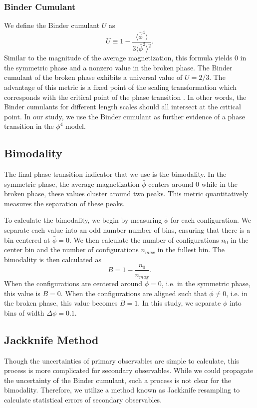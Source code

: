 \subsubsection{Binder Cumulant}
We define the Binder cumulant $U$ as \cite{binder1981}
\begin{equation}
U \equiv 1-\frac{\langle {\bar\phi}^4 \rangle}{3\langle {\bar\phi}^2\rangle^2}.
\end{equation}
Similar to the magnitude of the average magnetization, this formula yields $0$ in the symmetric phase and a nonzero value in the broken phase. The Binder cumulant of the broken phase exhibits a universal value of $U = 2/3$. The advantage of this metric is a fixed point of the scaling transformation which corresponds with the critical point of the phase transition \cite{landau2000}. In other words, the Binder cumulants for different length scales should all intersect at the critical point. In our study, we use the Binder cumulant as further evidence of a phase transition in the $\phi^4$ model.


\subsection{Bimodality}
The final phase transition indicator that we use is the bimodality. In the symmetric phase, the average magnetization $\bar\phi$ centers around $0$ while in the broken phase, these values cluster around two peaks. This metric quantitatively measures the separation of these peaks.

To calculate the bimodality, we begin by measuring $\bar\phi$ for each configuration. We separate each value into an odd number number of bins, ensuring that there is a bin centered at $\bar\phi=0$. We then calculate the number of configurations $n_0$ in the center bin and the number of configurations $n_{max}$ in the fullest bin. The bimodality is then calculated as
\begin{equation}
    B = 1 - \frac{n_0}{n_{max}}.
\end{equation}
When the configurations are centered around $\bar\phi=0$, i.e. in the symmetric phase, this value is $B=0$. When the configurations are aligned such that $\bar\phi\neq0$, i.e. in the broken phase, this value becomes $B=1$. In this study, we separate $\phi$ into bins of width $\Delta \phi = 0.1$.
\subsection{Jackknife Method}
Though the uncertainties of primary observables are simple to calculate, this process is more complicated for secondary observables. While we could propagate the uncertainty of the Binder cumulant, such a process is not clear for the bimodality. Therefore, we utilize a method known as Jackknife resampling to calculate statistical errors of secondary observables. 

